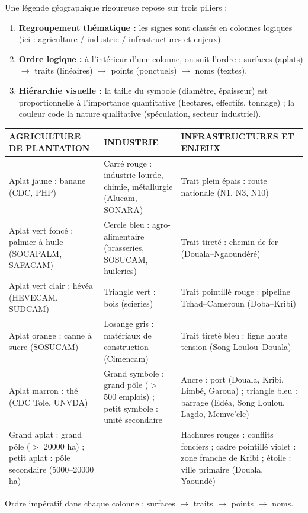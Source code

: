 \documentclass[11pt]{article}
\begin{document}
\begin{definition}
Une légende géographique rigoureuse repose sur trois piliers :
\begin{enumerate}
    \item \textbf{Regroupement thématique :} les signes sont classés en colonnes logiques (ici : agriculture / industrie / infrastructures et enjeux).
    \item \textbf{Ordre logique :} à l'intérieur d'une colonne, on suit l'ordre : surfaces (aplats) $\rightarrow$ traits (linéaires) $\rightarrow$ points (ponctuels) $\rightarrow$ noms (textes).
    \item \textbf{Hiérarchie visuelle :} la taille du symbole (diamètre, épaisseur) est proportionnelle à l'importance quantitative (hectares, effectifs, tonnage) ; la couleur code la nature qualitative (spéculation, secteur industriel).
\end{enumerate}
\end{definition}

\begin{exemplebox}
\begin{center}
\begin{tabularx}{\linewidth}{|X|X|X|}\hline
\rowcolor{popblueL} \textbf{AGRICULTURE DE PLANTATION} & \textbf{INDUSTRIE} & \textbf{INFRASTRUCTURES ET ENJEUX} \\ \hline
Aplat jaune : banane (CDC, PHP) & Carré rouge : industrie lourde, chimie, métallurgie (Alucam, SONARA) & Trait plein épais : route nationale (N1, N3, N10) \\ \hline
Aplat vert foncé : palmier à huile (SOCAPALM, SAFACAM) & Cercle bleu : agro-alimentaire (brasseries, SOSUCAM, huileries) & Trait tireté : chemin de fer (Douala--Ngaoundéré) \\ \hline
Aplat vert clair : hévéa (HEVECAM, SUDCAM) & Triangle vert : bois (scieries) & Trait pointillé rouge : pipeline Tchad--Cameroun (Doba--Kribi) \\ \hline
Aplat orange : canne à sucre (SOSUCAM) & Losange gris : matériaux de construction (Cimencam) & Trait tireté bleu : ligne haute tension (Song Loulou--Douala) \\ \hline
Aplat marron : thé (CDC Tole, UNVDA) & Grand symbole : grand pôle ($>$ 500 emplois) ; petit symbole : unité secondaire & Ancre : port (Douala, Kribi, Limbé, Garoua) ; triangle bleu : barrage (Edéa, Song Loulou, Lagdo, Memve'ele) \\ \hline
Grand aplat : grand pôle ($>$ \num{20000} ha) ; petit aplat : pôle secondaire (\num{5000}--\num{20000} ha) & & Hachures rouges : conflits fonciers ; cadre pointillé violet : zone franche de Kribi ; étoile : ville primaire (Douala, Yaoundé) \\ \hline
\end{tabularx}
\end{center}
Ordre impératif dans chaque colonne : surfaces $\rightarrow$ traits $\rightarrow$ points $\rightarrow$ noms.
\end{exemplebox}
\end{document}

